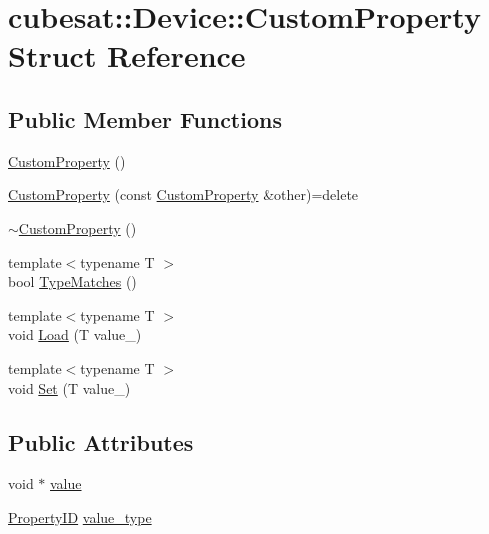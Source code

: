 \hypertarget{structcubesat_1_1Device_1_1CustomProperty}{}\section{cubesat\+:\+:Device\+:\+:Custom\+Property Struct Reference}
\label{structcubesat_1_1Device_1_1CustomProperty}
\subsection*{Public Member Functions}
\begin{DoxyCompactItemize}
\item 
\hyperlink{structcubesat_1_1Device_1_1CustomProperty_a25a532733331b17d7320ea491f0a5d9d}{Custom\+Property} ()
\item 
\hyperlink{structcubesat_1_1Device_1_1CustomProperty_a2e47a4d6fa0897143547282a9917d6f6}{Custom\+Property} (const \hyperlink{structcubesat_1_1Device_1_1CustomProperty}{Custom\+Property} \&other)=delete
\item 
\hyperlink{structcubesat_1_1Device_1_1CustomProperty_a95fbf77d154d897d33e629c5734ca299}{$\sim$\+Custom\+Property} ()
\item 
{\footnotesize template$<$typename T $>$ }\\bool \hyperlink{structcubesat_1_1Device_1_1CustomProperty_a1de276a5b24206e3bbcd6417dd9ef513}{Type\+Matches} ()
\item 
{\footnotesize template$<$typename T $>$ }\\void \hyperlink{structcubesat_1_1Device_1_1CustomProperty_abba6f25cccf279e9e69820978546abf9}{Load} (T value\+\_\+)
\item 
{\footnotesize template$<$typename T $>$ }\\void \hyperlink{structcubesat_1_1Device_1_1CustomProperty_a4cd2124bf2c57ea23c2b8b217377422c}{Set} (T value\+\_\+)
\end{DoxyCompactItemize}
\subsection*{Public Attributes}
\begin{DoxyCompactItemize}
\item 
void $\ast$ \hyperlink{structcubesat_1_1Device_1_1CustomProperty_a6e11ec1c5cfdd9c392f60260eecb6698}{value}
\item 
\hyperlink{namespacecubesat_ab5c769503b8a77bc90a47ca8705f2f86}{Property\+ID} \hyperlink{structcubesat_1_1Device_1_1CustomProperty_ac9cd21a36cd666169540dc5acda390b3}{value\+\_\+type}
\end{DoxyCompactItemize}


